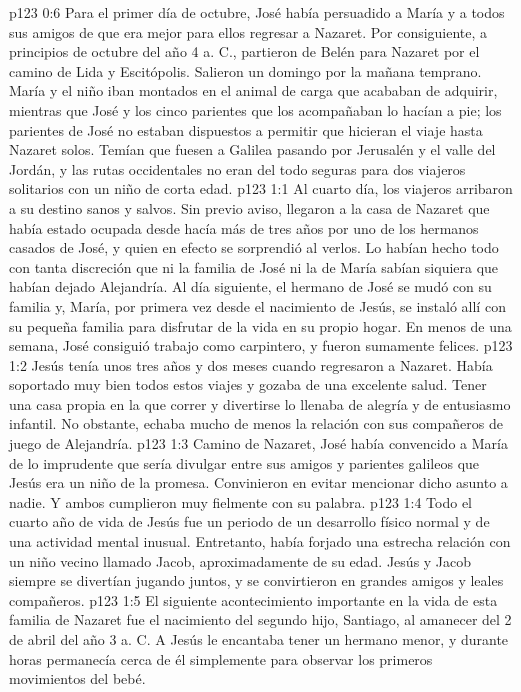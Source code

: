 \vs p123 0:6 Para el primer día de octubre, José había persuadido a María y a todos sus amigos de que era mejor para ellos regresar a Nazaret. Por consiguiente, a principios de octubre del año 4 a. C., partieron de Belén para Nazaret por el camino de Lida y Escitópolis. Salieron un domingo por la mañana temprano. María y el niño iban montados en el animal de carga que acababan de adquirir, mientras que José y los cinco parientes que los acompañaban lo hacían a pie; los parientes de José no estaban dispuestos a permitir que hicieran el viaje hasta Nazaret solos. Temían que fuesen a Galilea pasando por Jerusalén y el valle del Jordán, y las rutas occidentales no eran del todo seguras para dos viajeros solitarios con un niño de corta edad.
\vs p123 1:1 Al cuarto día, los viajeros arribaron a su destino sanos y salvos. Sin previo aviso, llegaron a la casa de Nazaret que había estado ocupada desde hacía más de tres años por uno de los hermanos casados de José, y quien en efecto se sorprendió al verlos. Lo habían hecho todo con tanta discreción que ni la familia de José ni la de María sabían siquiera que habían dejado Alejandría. Al día siguiente, el hermano de José se mudó con su familia y, María, por primera vez desde el nacimiento de Jesús, se instaló allí con su pequeña familia para disfrutar de la vida en su propio hogar. En menos de una semana, José consiguió trabajo como carpintero, y fueron sumamente felices.
\vs p123 1:2 Jesús tenía unos tres años y dos meses cuando regresaron a Nazaret. Había soportado muy bien todos estos viajes y gozaba de una excelente salud. Tener una casa propia en la que correr y divertirse lo llenaba de alegría y de entusiasmo infantil. No obstante, echaba mucho de menos la relación con sus compañeros de juego de Alejandría.
\vs p123 1:3 Camino de Nazaret, José había convencido a María de lo imprudente que sería divulgar entre sus amigos y parientes galileos que Jesús era un niño de la promesa. Convinieron en evitar mencionar dicho asunto a nadie. Y ambos cumplieron muy fielmente con su palabra.
\vs p123 1:4 Todo el cuarto año de vida de Jesús fue un periodo de un desarrollo físico normal y de una actividad mental inusual. Entretanto, había forjado una estrecha relación con un niño vecino llamado Jacob, aproximadamente de su edad. Jesús y Jacob siempre se divertían jugando juntos, y se convirtieron en grandes amigos y leales compañeros.
\vs p123 1:5 El siguiente acontecimiento importante en la vida de esta familia de Nazaret fue el nacimiento del segundo hijo, Santiago, al amanecer del 2 de abril del año 3 a. C. A Jesús le encantaba tener un hermano menor, y durante horas permanecía cerca de él simplemente para observar los primeros movimientos del bebé.
